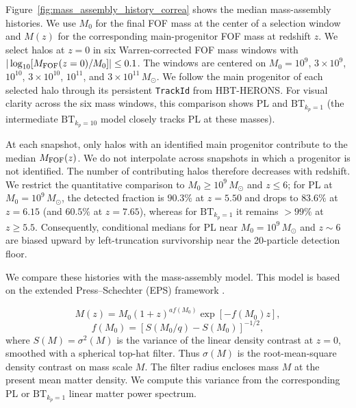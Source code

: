\documentclass[
 reprint,
 superscriptaddress,
 nofootinbib,
 nobibnotes,
 amsmath,
 amssymb,
 aps,
 prd,
 floatfix,
 longbibliography
]{revtex4-2}
\DeclareRobustCommand{\change}[1]{#1}
\newcommand\Tk[1]{{\color{red} \bf #1}}
\DeclareRobustCommand{\BTKPone}{\ensuremath{\mathrm{BT}_{k_p=1}}}
\DeclareRobustCommand{\BTKPten}{\ensuremath{\mathrm{BT}_{k_p=10}}}
\begin{document}

Figure~\ref{fig:mass_assembly_history_correa} shows the median mass-assembly histories. We use \(M_0\) for the final FOF mass at the center of a selection window and \(M(z)\) for the corresponding main-progenitor FOF mass at redshift \(z\). We select halos at \(z=0\) in six Warren-corrected FOF mass windows with \(|\log_{10}[M_{\rm FOF}(z=0)/M_0]|\le0.1\). The windows are centered on \(M_0=10^9\), \(3\times10^9\), \(10^{10}\), \(3\times10^{10}\), \(10^{11}\), and \(3\times10^{11}\,M_\odot\). We follow the main progenitor of each selected halo through its persistent \texttt{TrackId} from \textsc{HBT-HERONS}. For visual clarity across the six mass windows, this comparison shows PL and \BTKPone{} (the intermediate \BTKPten{} model closely tracks PL at these masses).


At each snapshot, only halos with an identified main progenitor contribute to the median \(M_{\rm FOF}(z)\). We do not interpolate across snapshots in which a progenitor is not identified. The number of contributing halos therefore decreases with redshift. We restrict the quantitative comparison to \(M_0\ge10^9\,M_\odot\) and \(z\le6\); for PL at \(M_0=10^9\,M_\odot\), the detected fraction is \(90.3\%\) at \(z=5.50\) and drops to \(83.6\%\) at \(z=6.15\) (and \(60.5\%\) at \(z=7.65\)), whereas for \BTKPone{} it remains \(>99\%\) at \(z\ge5.5\). Consequently, conditional medians for PL near \(M_0=10^9\,M_\odot\) and \(z\sim6\) are biased upward by left-truncation survivorship near the 20-particle detection floor.


\change{We compare these histories with the \citet{Correa2015MAHI} mass-assembly model. This model is based on the extended Press--Schechter (EPS) framework \citep{Bond1991ExcursionSet,LaceyCole1993MergerRates}.}

\begin{equation}
\label{eq:correa2015_mah}
M(z)=M_0(1+z)^{a f(M_0)}\exp[-f(M_0)z],
\end{equation}
\begin{equation}
\label{eq:correa2015_fm0}
f(M_0)=\left[S(M_0/q)-S(M_0)\right]^{-1/2},
\end{equation}
where \(S(M)=\sigma^2(M)\) is the variance of the linear density contrast at \(z=0\), smoothed with a spherical top-hat filter. Thus \(\sigma(M)\) is the root-mean-square density contrast on mass scale \(M\). The filter radius encloses mass \(M\) at the present mean matter density. We compute this variance from the corresponding PL or \BTKPone{} linear matter power spectrum.
\end{document}
